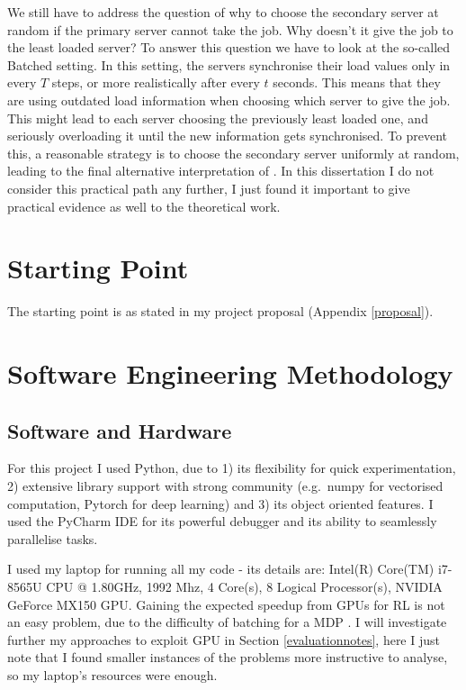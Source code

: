 We still have to address the question of why to choose the secondary server at random if the primary server cannot take the job. Why doesn't it give the job to the least loaded server? To answer this question we have to look at the so-called Batched setting. In this setting, the servers synchronise their load values only in every $T$ steps, or more realistically after every $t$ seconds. This means that they are using outdated load information when choosing which server to give the job. This might lead to each server choosing the previously least loaded one, and seriously overloading it until the new information gets synchronised. To prevent this, a reasonable strategy is to choose the secondary server uniformly at random, leading to the final alternative interpretation of \TwoThinning. In this dissertation I do not consider this practical path any further, I just found it important to give practical evidence as well to the theoretical work.
\fi


\section{Starting Point}

The starting point is as stated in my project proposal (Appendix \ref{proposal}). 


\section{Software Engineering Methodology}





\subsection{Software and Hardware}


For this project I used Python, due to 1) its flexibility for quick experimentation, 2) extensive library support with strong community (e.g.\ numpy \cite{harris2020numpy} for vectorised computation, Pytorch \cite{paszke2019pytorch} for deep learning) and 3) its object oriented features. I used the PyCharm IDE for its powerful debugger and its ability to seamlessly parallelise tasks.


I used my laptop for running all my code - its details are: Intel(R) Core(TM) i7-8565U CPU @ 1.80GHz, 1992 Mhz, 4 Core(s), 8 Logical Processor(s), NVIDIA GeForce MX150 GPU. Gaining the expected speedup from GPUs for RL is not an easy problem, due to the difficulty of batching for a MDP \cite{stooke2018gpudeepRL}. I will investigate further my approaches to exploit GPU in Section \ref{evaluationnotes}, here I just note that I found smaller instances of the problems more instructive to analyse, so my laptop's resources were enough.


